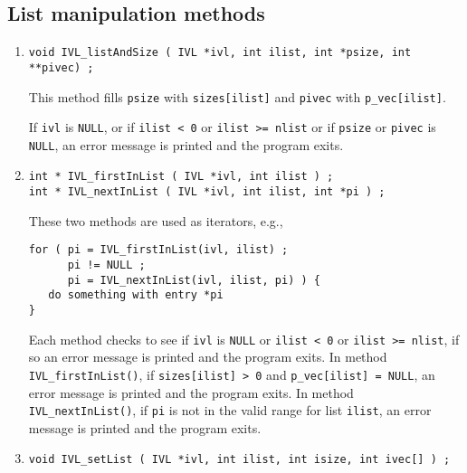 \subsection{List manipulation methods}
\label{subsection:IVL:proto:listmanip}
\par
\begin{enumerate}
\item
\begin{verbatim}
void IVL_listAndSize ( IVL *ivl, int ilist, int *psize, int **pivec) ;
\end{verbatim}
This method fills {\tt *psize} with {\tt sizes[ilist]}
and {\tt *pivec} with {\tt p\_vec[ilist]}.
\par {}
If {\tt ivl} is {\tt NULL},
or if {\tt ilist < 0} or {\tt ilist >= nlist}
or if {\tt psize} or {\tt pivec} is {\tt NULL},
an error message is printed and the program exits.
\item
\begin{verbatim}
int * IVL_firstInList ( IVL *ivl, int ilist ) ;
int * IVL_nextInList ( IVL *ivl, int ilist, int *pi ) ;
\end{verbatim}
These two methods are used as iterators, e.g.,
\begin{verbatim}
for ( pi = IVL_firstInList(ivl, ilist) ;
      pi != NULL ;
      pi = IVL_nextInList(ivl, ilist, pi) ) {
   do something with entry *pi
}
\end{verbatim}
\par {}
Each method checks to see if {\tt ivl} is {\tt NULL} or {\tt ilist
< 0} or {\tt ilist >= nlist}, if so an error message is printed and
the program exits.
In method {\tt IVL\_firstInList()}, if {\tt sizes[ilist] > 0} and
{\tt p\_vec[ilist] = NULL}, an error message is printed and
the program exits.
In method {\tt IVL\_nextInList()}, if {\tt pi} is not in the valid
range for list {\tt ilist}, an error message is printed and
the program exits.
\item
\begin{verbatim}
void IVL_setList ( IVL *ivl, int ilist, int isize, int ivec[] ) ;

\end{verbatim}
\end{enumerate}

